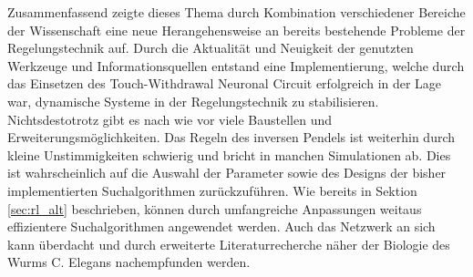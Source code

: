	Zusammenfassend zeigte dieses Thema durch Kombination verschiedener Bereiche der Wissenschaft eine neue Herangehensweise an bereits bestehende Probleme der Regelungstechnik auf. Durch die Aktualität und Neuigkeit der genutzten Werkzeuge und Informationsquellen entstand eine Implementierung, welche durch das Einsetzen des Touch-Withdrawal Neuronal Circuit \cite{WormLevelRL} erfolgreich in der Lage war, dynamische Systeme in der Regelungstechnik zu stabilisieren.\\
	Nichtsdestotrotz gibt es nach wie vor viele Baustellen und Erweiterungsmöglichkeiten. Das Regeln des inversen Pendels ist weiterhin durch kleine Unstimmigkeiten schwierig und bricht in manchen Simulationen ab. Dies ist wahrscheinlich auf die Auswahl der Parameter sowie des Designs der bisher implementierten Suchalgorithmen zurückzuführen. Wie bereits in Sektion \ref{sec:rl_alt} beschrieben, können durch umfangreiche Anpassungen weitaus effizientere Suchalgorithmen angewendet werden. Auch das Netzwerk an sich kann überdacht und durch erweiterte Literaturrecherche näher der Biologie des Wurms C. Elegans nachempfunden werden.


